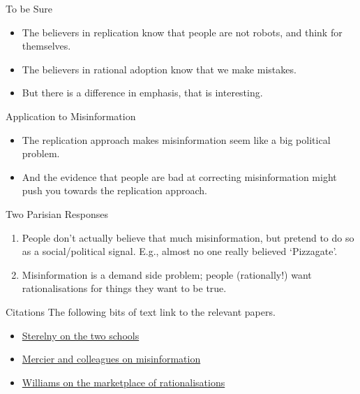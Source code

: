 \documentclass[
  17pt,
  letterpaper,
  ignorenonframetext,
  aspectratio=169,
  handout]{beamer}
\providecommand{\tightlist}{%
  \setlength{\itemsep}{0pt}\setlength{\parskip}{0pt}}\usepackage{longtable,booktabs,array}
\begin{document}
\begin{frame}{To be Sure}
\protect\hypertarget{to-be-sure}{}
\begin{itemize}[<+->]
\tightlist
\item
  The believers in replication know that people are not robots, and
  think for themselves.
\item
  The believers in rational adoption know that we make mistakes.
\item
  But there is a difference in emphasis, that is interesting.
\end{itemize}
\end{frame}

\begin{frame}{Application to Misinformation}
\protect\hypertarget{application-to-misinformation}{}
\begin{itemize}[<+->]
\tightlist
\item
  The replication approach makes misinformation seem like a big
  political problem.
\item
  And the evidence that people are bad at correcting misinformation
  might push you towards the replication approach.
\end{itemize}
\end{frame}

\begin{frame}{Two Parisian Responses}
\protect\hypertarget{two-parisian-responses}{}
\begin{enumerate}[<+->]
\tightlist
\item
  People don't actually believe that much misinformation, but pretend to
  do so as a social/political signal. E.g., almost no one really
  believed `Pizzagate'.
\item
  Misinformation is a demand side problem; people (rationally!) want
  rationalisations for things they want to be true.
\end{enumerate}
\end{frame}

\begin{frame}{Citations}
\protect\hypertarget{citations}{}
The following bits of text link to the relevant papers.

\begin{itemize}[<+->]
\tightlist
\item
  \href{https://www.sciencedirect.com/science/article/pii/S1369848616301078\#fn14}{Sterelny
  on the two schools}
\item
  \href{https://www.cambridge.org/core/journals/american-political-science-review/article/analytical-democratic-theory-a-microfoundational-approach/739A9A928A99A47994E4585059B03398}{Mercier
  and colleagues on misinformation}
\item
  \href{https://www.cambridge.org/core/journals/economics-and-philosophy/article/marketplace-of-rationalizations/41FB096344BD344908C7C992D0C0C0DC}{Williams
  on the marketplace of rationalisations}
\end{itemize}
\end{frame}
\end{document}
